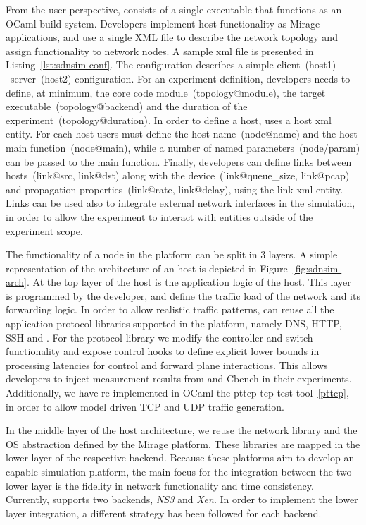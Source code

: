 From the user perspective, \sdnsim consists of a single executable
that functions as an OCaml build system. Developers implement host
functionality as Mirage applications, and use a single XML file
to describe the network topology and assign functionality to network nodes.
A sample xml file is presented in Listing~\ref{lst:sdnsim-conf}. The
configuration describes a simple client~(host1)~-~server~(host2) configuration.
For an experiment definition, developers needs to define, at minimum,  the core
code module~(topology@module), the target executable~(topology@backend) and the
duration of the experiment~(topology@duration). In order to define a host,
\sdnsim uses a host xml entity. For each host users must define the host
name~(node@name) and the host main function~(node@main), while a number of named
parameters~(node/param) can be passed to the main function. Finally, developers
can define links between hosts~(link@src, link@dst) along with the
device~(link@queue\_size, link@pcap) and propagation properties~(link@rate,
link@delay), using the link xml entity. Links can be used also to integrate
external network interfaces in the simulation, in order to allow the experiment to
interact with entities outside of the experiment scope.

The functionality of a node in the \sdnsim platform can be split in 3 layers.  A
simple representation of the architecture of an \sdnsim host is depicted in
Figure~\ref{fig:sdnsim-arch}.  At the top layer of the host is the application
logic of the host. This layer is programmed by the developer, and define the
traffic load of the network and its forwarding logic. In order to allow
realistic traffic patterns, \sdnsim can reuse all the application protocol
libraries supported in the \mirage platform, namely DNS, HTTP, SSH and \of. For
the \of protocol library we modify the controller and switch functionality and
expose control hooks to define explicit lower bounds in processing latencies for
control and forward plane interactions.  This allows developers to inject
measurement results from \oflops and Cbench in their experiments.  Additionally,
we have re-implemented in OCaml the pttcp tcp test tool~\ref{pttcp}, in order to
allow model driven TCP and UDP traffic generation. 

In the middle layer of the host architecture, we reuse the network library and
the OS abstraction defined by the Mirage platform. These libraries are mapped in
the lower layer of the respective backend. Because these platforms aim to
develop an \of capable simulation platform, the main focus for the integration
between the two lower layer is the fidelity in network functionality and time
consistency. Currently, \sdnsim supports two backends, {\it NS3} and {\it Xen}.
In order to implement the lower layer integration, a different strategy has been 
followed for each backend. 

